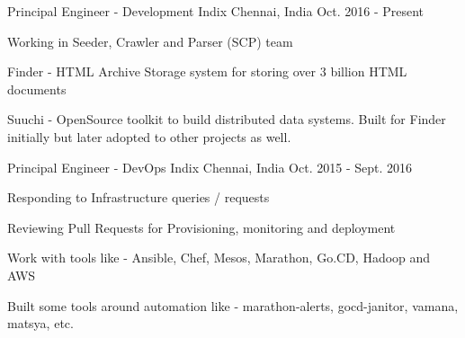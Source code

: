 

\begin{cventries}

  \cventry
    {Principal Engineer - Development} %
    {Indix} %
    {Chennai, India} %
    {Oct. 2016 - Present} %
    {
      \begin{cvitems} %
        \item {Working in Seeder, Crawler and Parser (SCP) team}
        \item {Finder - HTML Archive Storage system for storing over 3 billion HTML documents}
        \item {Suuchi - OpenSource toolkit to build distributed data systems. Built for Finder initially but later adopted to other projects as well.}
      \end{cvitems}
    }

  \cventry
    {Principal Engineer - DevOps} %
    {Indix} %
    {Chennai, India} %
    {Oct. 2015 - Sept. 2016} %
    {
      \begin{cvitems} %
        \item {Responding to Infrastructure queries / requests}
        \item {Reviewing Pull Requests for Provisioning, monitoring and deployment}
        \item {Work with tools like - Ansible, Chef, Mesos, Marathon, Go.CD, Hadoop and AWS}
        \item {Built some tools around automation like - marathon-alerts, gocd-janitor, vamana, matsya, etc.}
      \end{cvitems}
    }


\end{cventries}

